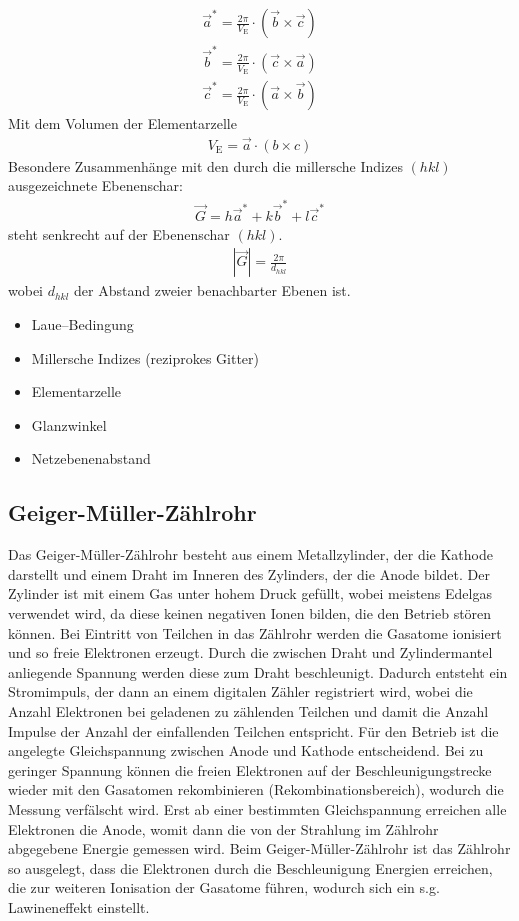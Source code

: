 \documentclass[10pt, a4paper]{article}
\begin{document}
\begin{align}
  \vec{a}^{*} = \frac{2\pi}{V_\mathrm{E}} \cdot ( \vec{b} \times \vec{c} ) \nonumber\\
  \vec{b}^{*} = \frac{2\pi}{V_\mathrm{E}} \cdot ( \vec{c} \times \vec{a} ) \nonumber\\
  \vec{c}^{*} = \frac{2\pi}{V_\mathrm{E}} \cdot ( \vec{a} \times \vec{b} )
\end{align}
Mit dem Volumen der Elementarzelle
\begin{align}
  V_\mathrm{E} = \vec{a} \cdot \left( b \times c \right)
\end{align}
Besondere Zusammenhänge mit den durch die millersche Indizes $(hkl)$ ausgezeichnete Ebenenschar:
\begin{align}
  \vec{G} = h \vec{a}^{*} + k \vec{b}^{*} + l \vec{c}^{*}
\end{align}
steht senkrecht auf der Ebenenschar $(hkl)$.
\begin{align}
  | \vec{G} | = \frac{2\pi}{d_{hkl}}
\end{align}
wobei $d_{hkl}$ der Abstand zweier benachbarter Ebenen ist.



\begin{itemize}
  \item Laue--Bedingung
  \item Millersche Indizes (reziprokes Gitter)
  \item Elementarzelle
  \item Glanzwinkel
  \item Netzebenenabstand
\end{itemize}

\subsection{Geiger-Müller-Zählrohr}

Das Geiger-Müller-Zählrohr besteht aus einem Metallzylinder, der die Kathode darstellt und einem Draht im Inneren des Zylinders, der die Anode bildet.
Der Zylinder ist mit einem Gas unter hohem Druck gefüllt, wobei meistens Edelgas verwendet wird, da diese keinen negativen Ionen bilden, die den Betrieb stören können.
Bei Eintritt von Teilchen in das Zählrohr werden die Gasatome ionisiert und so freie Elektronen erzeugt.
Durch die zwischen Draht und Zylindermantel anliegende Spannung werden diese zum Draht beschleunigt.
Dadurch entsteht ein Stromimpuls, der dann an einem digitalen Zähler registriert wird, wobei die Anzahl Elektronen bei geladenen zu zählenden Teilchen und damit die Anzahl Impulse der Anzahl der einfallenden Teilchen entspricht.
Für den Betrieb ist die angelegte Gleichspannung zwischen Anode und Kathode entscheidend.
Bei zu geringer Spannung können die freien Elektronen auf der Beschleunigungstrecke wieder mit den Gasatomen rekombinieren (Rekombinationsbereich), wodurch die Messung verfälscht wird.
Erst ab einer bestimmten Gleichspannung erreichen alle Elektronen die Anode, womit dann die von der Strahlung im Zählrohr abgegebene Energie gemessen wird.
Beim Geiger-Müller-Zählrohr ist das Zählrohr so ausgelegt, dass die Elektronen durch die Beschleunigung Energien erreichen, die zur weiteren Ionisation der Gasatome führen, wodurch sich ein s.g. Lawineneffekt einstellt.
\end{document}
